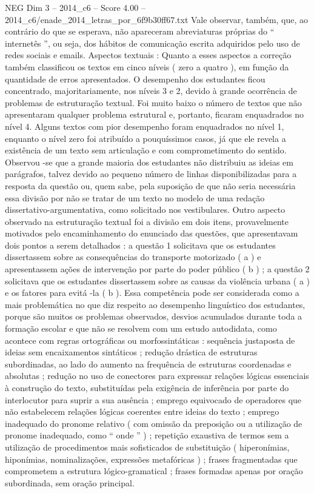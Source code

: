 \begin{textsample}{NEG Dim 3 – 2014\_c6 – Score 4.00 – 2014\_c6/enade\_2014\_letras\_por\_6f9b30ff67.txt}
Vale observar, também, que, ao contrário do que se esperava, não apareceram abreviaturas próprias do “ internetês ”, ou seja, dos hábitos de comunicação escrita adquiridos pelo uso de redes sociais e emails.
Aspectos textuais : Quanto a esses aspectos a correção também classificou os textos em cinco níveis ( zero a quatro ), em função da quantidade de erros apresentados.
O desempenho dos estudantes ficou concentrado, majoritariamente, nos níveis 3 e 2, devido à grande ocorrência de problemas de estruturação textual.
Foi muito baixo o número de textos que não apresentaram qualquer problema estrutural e, portanto, ficaram enquadrados no nível 4.
Alguns textos com pior desempenho foram enquadrados no nível 1, enquanto o nível zero foi atribuído a pouquíssimos casos, já que ele revela a existência de um texto sem articulação e com comprometimento do sentido.
Observou -se que a grande maioria dos estudantes não distribuiu as ideias em parágrafos, talvez devido ao pequeno número de linhas disponibilizadas para a resposta da questão ou, quem sabe, pela suposição de que não seria necessária essa divisão por não se tratar de um texto no modelo de uma redação dissertativo-argumentativa, como solicitado nos vestibulares.
Outro aspecto observado na estruturação textual foi a divisão em dois itens, provavelmente motivados pelo encaminhamento do enunciado das questões, que apresentavam dois pontos a serem detalhados : a questão 1 solicitava que os estudantes dissertassem sobre as consequências do transporte motorizado ( a ) e apresentassem ações de intervenção por parte do poder público ( b ) ; a questão 2 solicitava que os estudantes dissertassem sobre as causas da violência urbana ( a ) e os fatores para evitá -la ( b ).
Essa competência pode ser considerada como a mais problemática no que diz respeito ao desempenho linguístico dos estudantes, porque são muitos os problemas observados, desvios acumulados durante toda a formação escolar e que não se resolvem com um estudo autodidata, como acontece com regras ortográficas ou morfossintáticas : sequência justaposta de ideias sem encaixamentos sintáticos ; redução drástica de estruturas subordinadas, ao lado do aumento na frequência de estruturas coordenadas e absolutas ; redução no uso de conectores para expressar relações lógicas essenciais à construção do texto, substituídas pela exigência de inferência por parte do interlocutor para suprir a sua ausência ; emprego equivocado de operadores que não estabelecem relações lógicas coerentes entre ideias do texto ; emprego inadequado do pronome relativo ( com omissão da preposição ou a utilização de pronome inadequado, como “ onde ” ) ; repetição exaustiva de termos sem a utilização de procedimentos mais sofisticados de substituição ( hiperonímias, hiponímias, nominalizações, expressões metafóricas ) ; frases fragmentadas que comprometem a estrutura lógico-gramatical ; frases formadas apenas por oração subordinada, sem oração principal.

\end{textsample}
